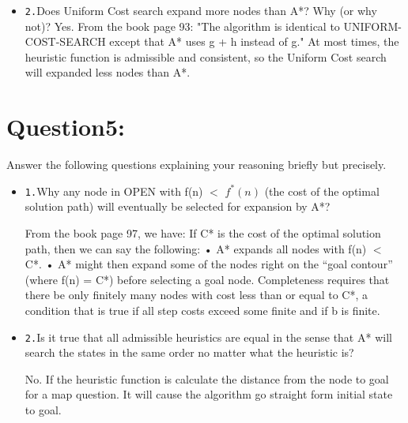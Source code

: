 \documentclass{article}
\begin{document}
\begin{itemize}
    \item \texttt{2.}Does Uniform Cost search expand more nodes than A*? Why (or why not)?\newline
    Yes. From the book page 93:\newline
    "The algorithm is identical to UNIFORM-COST-SEARCH except
    that A* uses g + h instead of g."\newline
    At most times, the heuristic function is admissible and consistent, so the Uniform Cost search will expanded less nodes than 
    A*.
\end{itemize}




\section{Question5:}
Answer the following questions explaining your reasoning briefly but precisely.

\begin{itemize}
	\item \texttt{1.}Why any node in OPEN with f(n) $<$ $f^*(n)$ (the cost of the optimal solution path) will eventually be selected for expansion by A*?\newline
    
    From the book page 97, we have: \newline If C* is the cost of the optimal solution path, then we can say the following:\newline
• A* expands all nodes with f(n) $<$ C*.\newline
• A* might then expand some of the nodes right on the “goal contour” (where f(n) = C*)\newline
before selecting a goal node.
Completeness requires that there be only finitely many nodes with cost less than or equal to
C*, a condition that is true if all step costs exceed some finite  and if b is finite.\newline



\end{itemize}

\begin{itemize}
    \item \texttt{2.}Is it true that all admissible heuristics are equal in the sense that A* will search the states in the same order no matter what the heuristic is?\newline
    
    No. If the heuristic function is calculate the distance from the node to goal for a map question. It will cause
    the algorithm go straight form initial state to goal.
\end{itemize}
\end{document}
